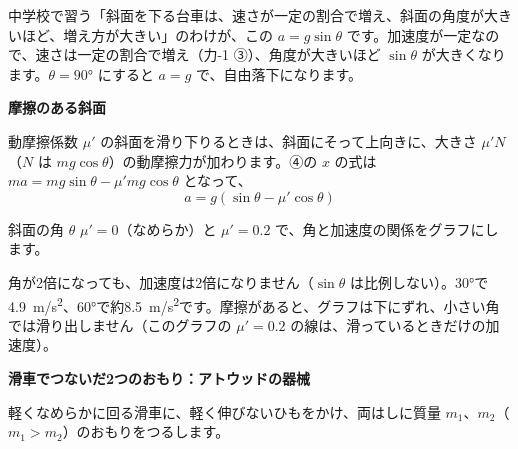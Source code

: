 \par\vspace{3pt}
中学校で習う「斜面を下る台車は、速さが一定の割合で増え、斜面の角度が大きいほど、増え方が大きい」のわけが、この $a=g\sin\theta$ です。加速度が一定なので、速さは一定の割合で増え（力-1 ③）、角度が大きいほど $\sin\theta$ が大きくなります。$\theta=90°$ にすると $a=g$ で、自由落下になります。

\noindent\textbf{摩擦のある斜面}\par
\noindent 動摩擦係数 $\mu'$ の斜面を滑り下りるときは、斜面にそって上向きに、大きさ $\mu'N$（$N$ は $mg\cos\theta$）の動摩擦力が加わります。④の $x$ の式は $ma=\allowbreak mg\sin\theta-\mu'mg\cos\theta$ となって、
\[ a=g(\sin\theta-\mu'\cos\theta) \]
\begin{lrbox}{\pxcplota}\end{lrbox}%
\begin{phbaisuru}{斜面の角 $\theta$}
$\mu'=0$（なめらか）と $\mu'=0.2$ で、角と加速度の関係をグラフにします。
\begin{bkcenter}
\usebox{\pxcplota}
\end{bkcenter}
角が2倍になっても、加速度は2倍になりません（$\sin\theta$ は比例しない）。30°で\qty{4.9}{m/s^2}、60°で約\qty{8.5}{m/s^2}です。摩擦があると、グラフは下にずれ、小さい角では滑り出しません（このグラフの $\mu'=0.2$ の線は、滑っているときだけの加速度）。
\end{phbaisuru}

\noindent\textbf{滑車でつないだ2つのおもり：アトウッドの器械}\par
\noindent 軽くなめらかに回る滑車に、軽く伸びないひもをかけ、両はしに質量 $m_1$、$m_2$（$m_1>m_2$）のおもりをつるします。

